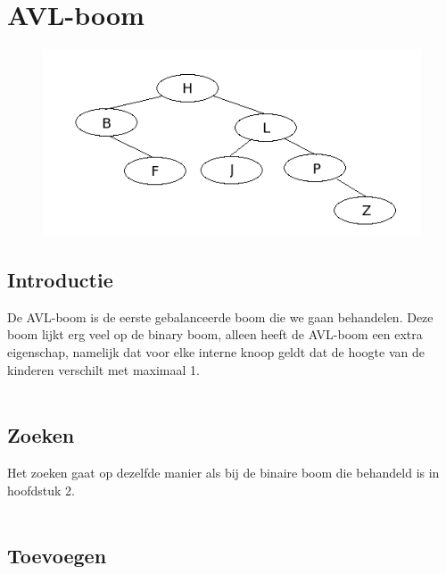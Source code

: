 \chapter{AVL-boom}
\label{sec:Hoofdstuk 4}

\begin{figure}[h]
	\centering
		\includegraphics[width=\textwidth]{chap4/avltree}
	\label{fig:avltree}
\end{figure}

\section{Introductie}
De AVL-boom is de eerste gebalanceerde boom die we gaan behandelen. Deze boom lijkt erg veel op de binary boom, alleen heeft de AVL-boom een extra eigenschap, namelijk dat voor elke interne knoop geldt dat de hoogte van de kinderen verschilt met maximaal 1.\\
\\
\section{Zoeken}
Het zoeken gaat op dezelfde manier als bij de binaire boom die behandeld is in hoofdstuk 2.\\
\\
\section{Toevoegen}


